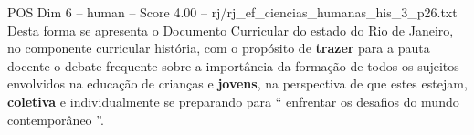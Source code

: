 \begin{textsample}{POS Dim 6 – human – Score 4.00 – rj/rj\_ef\_ciencias\_humanas\_his\_3\_p26.txt}  \label{ex:f6_pos_003}
Desta forma se apresenta o Documento Curricular do estado do Rio de Janeiro, no componente curricular história, com o propósito de \textbf{trazer} para a pauta docente o debate frequente sobre a importância da formação de todos os sujeitos envolvidos na educação de crianças e \textbf{jovens}, na perspectiva de que estes estejam, \textbf{coletiva} e individualmente se preparando para “ enfrentar os desafios do mundo contemporâneo ”.

\end{textsample}
